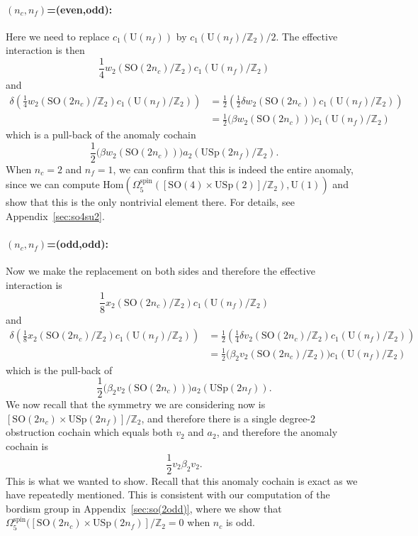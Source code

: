 \documentclass[12pt]{article}
\numberwithin{equation}{section}
\def\bZ{\mathbb{Z}}
\def\U{\mathrm{U}}
\def\SO{\mathrm{SO}}
\def\USp{\mathrm{USp}}
\begin{document}
\paragraph{$(n_c,n_f)$=(even,odd):}
Here we need to replace $c_1(\U(n_f))$ by $c_1(\U(n_f)/\bZ_2)/2$.
The effective interaction is then \begin{equation}
\frac14 w_2(\SO(2n_c)/\bZ_2) c_1(\U(n_f)/\bZ_2) 
\end{equation} and \begin{align}
\delta\left(\frac14 w_2(\SO(2n_c)/\bZ_2) c_1(\U(n_f)/\bZ_2) \right)
&= \frac12 \left(\frac12\delta w_2(\SO(2n_c)) c_1(\U(n_f)/\bZ_2) \right) \\
&= \frac12 \Big(\beta w_2(\SO(2n_c))\Big)c_1(\U(n_f)/\bZ_2) 
\end{align}
which is a pull-back of the anomaly cochain
\begin{equation}
 \frac12 \Big(\beta w_2(\SO(2n_c))\Big)a_2(\USp(2n_f)/\bZ_2). 
\end{equation}
When $n_c=2$ and $n_f=1$, we can confirm that this is indeed the entire anomaly,
since we can compute $\mathrm{Hom}(\Omega^\text{spin}_5([\SO(4)\times \USp(2)]/\bZ_2),\U(1))$
and show that this is the only nontrivial element there.
For details, see Appendix~\ref{sec:so4su2}.

\paragraph{$(n_c,n_f)$=(odd,odd):}
Now we make the replacement on both sides and therefore the effective interaction is \begin{equation}
\frac18 x_2(\SO(2n_c)/\bZ_2) c_1(\U(n_f)/\bZ_2) 
\end{equation}
and \begin{align}
\delta\left(\frac18 x_2(\SO(2n_c)/\bZ_2) c_1(\U(n_f)/\bZ_2) \right)
&= \frac12 \left(\frac14\delta v_2(\SO(2n_c)/\bZ_2) c_1(\U(n_f)/\bZ_2) \right) \\
&= \frac12 \Big(\beta_2 v_2(\SO(2n_c)/\bZ_2)\Big)c_1(\U(n_f)/\bZ_2) 
\end{align}
which is the pull-back of \begin{equation}
 \frac12 \Big(\beta_2 v_2(\SO(2n_c))\Big)a_2(\USp(2n_f)).
\end{equation}
We now recall that the symmetry we are considering now is $[\SO(2n_c)\times \USp(2n_f)]/\bZ_2$,
and therefore there is a single degree-2 obstruction cochain which equals both $v_2$ and $a_2$,
and therefore the anomaly cochain is \begin{equation}
 \frac12 v_2\beta_2 v_2.
\end{equation}
This is what we wanted to show.
Recall that this anomaly cochain is exact as we have repeatedly mentioned.
This is consistent with our computation of the bordism group in Appendix~\ref{sec:so(2odd)},
where we show that $\Omega^\text{spin}_5([\SO(2n_c)\times \USp(2n_f)]/\bZ_2=0$ when $n_c$ is odd.
\end{document}
